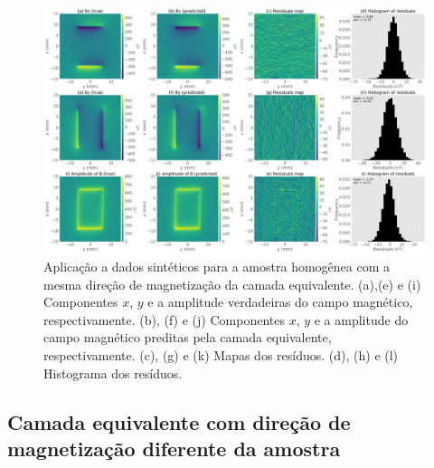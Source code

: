 \begin{figure}
	\centering
	\includegraphics[width=1.15\textwidth]{Fig/mag_vec/amostra_homo_correto/comparison_true_estimated.png}
	\caption{Aplicação a dados sintéticos para a amostra homogênea com a mesma direção de magnetização da camada equivalente. (a),(e) e (i) Componentes $x$, $y$ e a amplitude verdadeiras do campo magnético, respectivamente. (b), (f) e (j) Componentes $x$, $y$ e a amplitude do campo magnético preditas pela camada equivalente, respectivamente. (c), (g) e (k) Mapas dos resíduos. (d), (h) e (l) Histograma dos resíduos.}
	\label{fig:comparison_homo_sample_samedir}
\end{figure}


\subsection{Camada equivalente com direção de magnetização diferente da amostra}
\label{subsec:homo_dif_dir}

